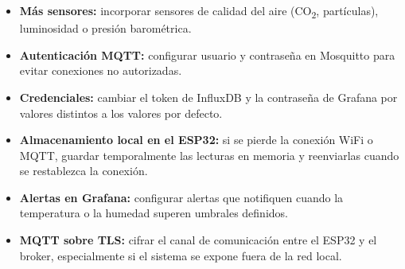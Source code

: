 \documentclass[12pt, a4paper]{article}
\begin{document}
\begin{itemize}
    \item \textbf{Más sensores:} incorporar sensores de calidad del aire (CO\textsubscript{2},
          partículas), luminosidad o presión barométrica.
    \item \textbf{Autenticación MQTT:} configurar usuario y contraseña en Mosquitto
          para evitar conexiones no autorizadas.
    \item \textbf{Credenciales:} cambiar el token de InfluxDB y la contraseña de
          Grafana por valores distintos a los valores por defecto.
    \item \textbf{Almacenamiento local en el ESP32:} si se pierde la conexión WiFi
          o MQTT, guardar temporalmente las lecturas en memoria y reenviarlas cuando
          se restablezca la conexión.
    \item \textbf{Alertas en Grafana:} configurar alertas que notifiquen cuando la
          temperatura o la humedad superen umbrales definidos.
    \item \textbf{MQTT sobre TLS:} cifrar el canal de comunicación entre el ESP32
          y el broker, especialmente si el sistema se expone fuera de la red local.
\end{itemize}
\end{document}
